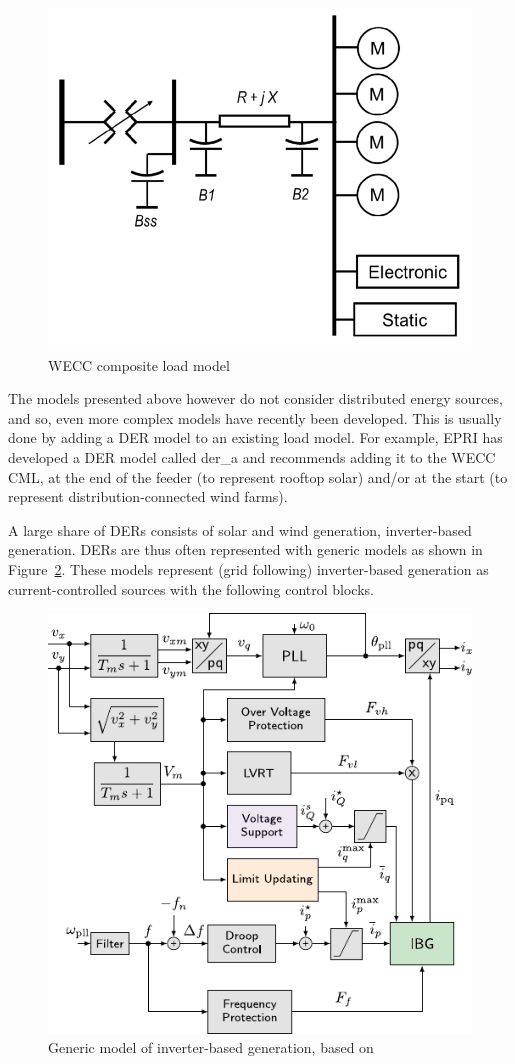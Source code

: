 \begin{figure}
    \centering
    \includegraphics[width=0.5\linewidth]{Figs/WECC-composite-load-model.png}
    \caption{WECC composite load model~\cite{NERCloadModelTF}}
    \label{fig:WECC-CLM}
\end{figure}

The models presented above however do not consider distributed energy sources, and so, even more complex models have recently been developed. This is usually done by adding a DER model to an existing load model. For example, EPRI has developed a DER model called der\_a and recommends adding it to the WECC CML, at the end of the feeder (\eg to represent rooftop solar) and/or at the start (\eg to represent distribution-connected wind farms).

A large share of DERs consists of solar and wind generation, \ie inverter-based generation. DERs are thus often represented with generic models as shown in Figure~\ref{fig:IBG}. These models represent (grid following) inverter-based generation as current-controlled sources with the following control blocks.

\begin{figure}
    \centering
    \includegraphics[width=0.6\linewidth]{Figs/IBG.pdf}
    \caption{Generic model of inverter-based generation, based on~\cite{Vorwerk}}
    \label{fig:IBG}
\end{figure}

